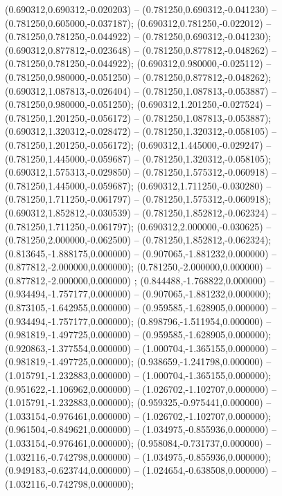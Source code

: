  (0.690312,0.690312,-0.020203) -- (0.781250,0.690312,-0.041230) -- (0.781250,0.605000,-0.037187);
 (0.690312,0.781250,-0.022012) -- (0.781250,0.781250,-0.044922) -- (0.781250,0.690312,-0.041230);
 (0.690312,0.877812,-0.023648) -- (0.781250,0.877812,-0.048262) -- (0.781250,0.781250,-0.044922);
 (0.690312,0.980000,-0.025112) -- (0.781250,0.980000,-0.051250) -- (0.781250,0.877812,-0.048262);
 (0.690312,1.087813,-0.026404) -- (0.781250,1.087813,-0.053887) -- (0.781250,0.980000,-0.051250);
 (0.690312,1.201250,-0.027524) -- (0.781250,1.201250,-0.056172) -- (0.781250,1.087813,-0.053887);
 (0.690312,1.320312,-0.028472) -- (0.781250,1.320312,-0.058105) -- (0.781250,1.201250,-0.056172);
 (0.690312,1.445000,-0.029247) -- (0.781250,1.445000,-0.059687) -- (0.781250,1.320312,-0.058105);
 (0.690312,1.575313,-0.029850) -- (0.781250,1.575312,-0.060918) -- (0.781250,1.445000,-0.059687);
 (0.690312,1.711250,-0.030280) -- (0.781250,1.711250,-0.061797) -- (0.781250,1.575312,-0.060918);
 (0.690312,1.852812,-0.030539) -- (0.781250,1.852812,-0.062324) -- (0.781250,1.711250,-0.061797);
 (0.690312,2.000000,-0.030625) -- (0.781250,2.000000,-0.062500) -- (0.781250,1.852812,-0.062324);
 (0.813645,-1.888175,0.000000) -- (0.907065,-1.881232,0.000000) -- (0.877812,-2.000000,0.000000);
 (0.781250,-2.000000,0.000000) -- (0.877812,-2.000000,0.000000) ;
 (0.844488,-1.768822,0.000000) -- (0.934494,-1.757177,0.000000) -- (0.907065,-1.881232,0.000000);
 (0.873105,-1.642955,0.000000) -- (0.959585,-1.628905,0.000000) -- (0.934494,-1.757177,0.000000);
 (0.898796,-1.511954,0.000000) -- (0.981819,-1.497725,0.000000) -- (0.959585,-1.628905,0.000000);
 (0.920863,-1.377554,0.000000) -- (1.000704,-1.365155,0.000000) -- (0.981819,-1.497725,0.000000);
 (0.938659,-1.241798,0.000000) -- (1.015791,-1.232883,0.000000) -- (1.000704,-1.365155,0.000000);
 (0.951622,-1.106962,0.000000) -- (1.026702,-1.102707,0.000000) -- (1.015791,-1.232883,0.000000);
 (0.959325,-0.975441,0.000000) -- (1.033154,-0.976461,0.000000) -- (1.026702,-1.102707,0.000000);
 (0.961504,-0.849621,0.000000) -- (1.034975,-0.855936,0.000000) -- (1.033154,-0.976461,0.000000);
 (0.958084,-0.731737,0.000000) -- (1.032116,-0.742798,0.000000) -- (1.034975,-0.855936,0.000000);
 (0.949183,-0.623744,0.000000) -- (1.024654,-0.638508,0.000000) -- (1.032116,-0.742798,0.000000);

